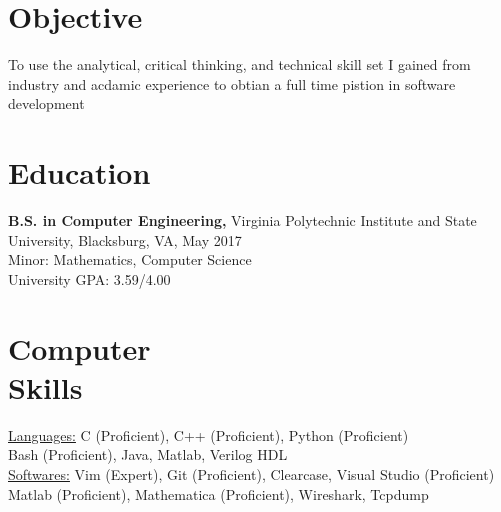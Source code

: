 \documentclass[margin]{res}
\begin{document}
 
 
\address{} %
\address{8 Russell Ave Unit 410 \\ Gaithersburg, MD 20877 \\
        (540) 835-8657 \\ sheng.wei@hughes.com } %
 
\begin{resume} %

\section{Objective}
To use the analytical, critical thinking, and technical skill set I gained from industry
and acdamic experience to obtian a full time pistion in software development

\section{Education} 
{\bf B.S. in Computer Engineering,} Virginia Polytechnic Institute and State University, Blacksburg, VA, May 2017 \\ Minor: Mathematics, Computer Science \\
University GPA: 3.59/4.00

\section{Computer \\ Skills}
\underline{Languages:}  C (Proficient), C++ (Proficient), Python (Proficient) \\ Bash (Proficient), Java, Matlab, Verilog HDL \\ 
\underline{Softwares:}  Vim (Expert), Git (Proficient), Clearcase, Visual Studio (Proficient) \\
     					    Matlab (Proficient), Mathematica (Proficient), Wireshark, Tcpdump
 

\end{resume}
\end{document}
